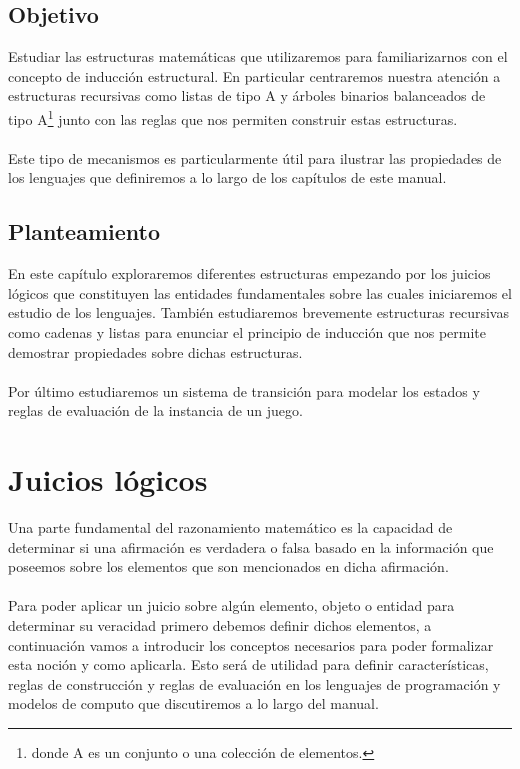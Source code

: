 \subsection*{Objetivo}
Estudiar las estructuras matemáticas que utilizaremos para familiarizarnos con el concepto de inducción estructural. En particular centraremos nuestra atención a estructuras recursivas como listas de tipo A y árboles binarios balanceados de tipo A\footnote{donde A es un conjunto o una colección de elementos.} junto con las reglas que nos permiten construir estas estructuras.\\\\
Este tipo de mecanismos es particularmente útil para ilustrar las propiedades de los lenguajes que definiremos a lo largo de los capítulos de este manual.

\subsection*{Planteamiento}
En este capítulo exploraremos diferentes estructuras empezando por los juicios lógicos que constituyen las entidades fundamentales sobre las cuales iniciaremos el estudio de los lenguajes.
También estudiaremos brevemente estructuras recursivas como cadenas y listas para enunciar el principio de inducción que nos permite demostrar propiedades sobre dichas estructuras.\\\\ Por último estudiaremos un sistema de transición para modelar los estados y reglas de evaluación de la instancia de un juego.

\section{Juicios lógicos}

    Una parte fundamental del razonamiento matemático es la capacidad de determinar si una afirmación es verdadera o falsa basado en la información que poseemos sobre los elementos que son mencionados en dicha afirmación. \\\\
    Para poder aplicar un juicio sobre algún elemento, objeto o entidad para determinar su veracidad primero debemos definir dichos elementos, a continuación vamos a introducir los conceptos necesarios para poder formalizar esta noción y como aplicarla. Esto será de utilidad para definir características, reglas de construcción y reglas de evaluación en los lenguajes de programación y modelos de computo que discutiremos a lo largo del manual.\\


